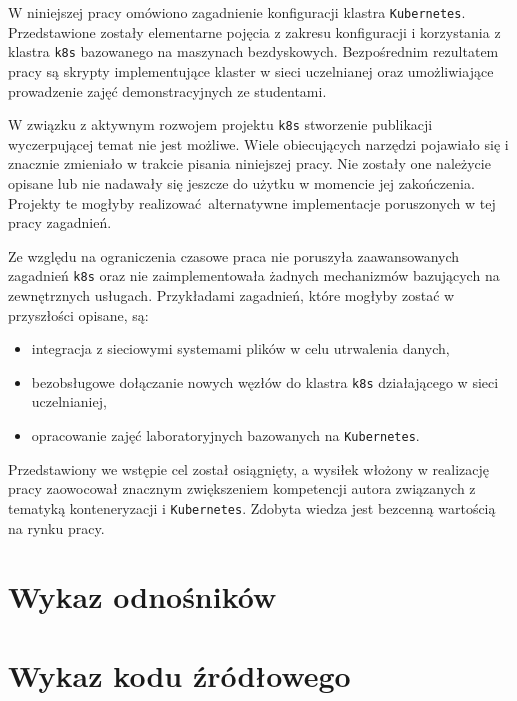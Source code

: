 \documentclass[a4paper,12pt,twoside,openany]{report}
\providecommand{\tightlist}{%
  \setlength{\itemsep}{0pt}\setlength{\parskip}{0pt}}
\newcommand{\passthrough}[1]{#1}
\begin{document}
W niniejszej pracy omówiono zagadnienie konfiguracji klastra
\passthrough{\lstinline!Kubernetes!}. Przedstawione zostały elementarne
pojęcia z zakresu konfiguracji i korzystania z klastra
\passthrough{\lstinline!k8s!} bazowanego na maszynach bezdyskowych.
Bezpośrednim rezultatem pracy są skrypty implementujące klaster w sieci
uczelnianej oraz umożliwiające prowadzenie zajęć demonstracyjnych ze
studentami.

W związku z aktywnym rozwojem projektu \passthrough{\lstinline!k8s!}
stworzenie publikacji wyczerpującej temat nie jest możliwe. Wiele
obiecujących narzędzi pojawiało się i znacznie zmieniało w trakcie
pisania niniejszej pracy. Nie zostały one należycie opisane lub nie
nadawały się jeszcze do użytku w momencie jej zakończenia. Projekty te
mogłyby realizować~alternatywne implementacje poruszonych w tej pracy
zagadnień.

Ze względu na ograniczenia czasowe praca nie poruszyła zaawansowanych
zagadnień \passthrough{\lstinline!k8s!} oraz nie zaimplementowała
żadnych mechanizmów bazujących na zewnętrznych usługach. Przykładami
zagadnień, które mogłyby zostać w przyszłości opisane, są:

\begin{itemize}
\tightlist
\item
  integracja z sieciowymi systemami plików w celu utrwalenia danych,
\item
  bezobsługowe dołączanie nowych węzłów do klastra
  \passthrough{\lstinline!k8s!} działającego w sieci uczelnianiej,
\item
  opracowanie zajęć laboratoryjnych bazowanych na
  \passthrough{\lstinline!Kubernetes!}.
\end{itemize}

Przedstawiony we wstępie cel został osiągnięty, a wysiłek włożony w
realizację pracy zaowocował znacznym zwiększeniem kompetencji autora
związanych z tematyką konteneryzacji i
\passthrough{\lstinline!Kubernetes!}. Zdobyta wiedza jest bezcenną
wartością na rynku pracy.

\appendix

\hypertarget{wykaz-odnoux15bnikuxf3w}{%
\chapter{Wykaz odnośników}\label{wykaz-odnoux15bnikuxf3w}}

\theendnotes

\hypertarget{wykaz-kodu-ux17aruxf3dux142owego}{%
\chapter{Wykaz kodu źródłowego}\label{wykaz-kodu-ux17aruxf3dux142owego}}
\end{document}
